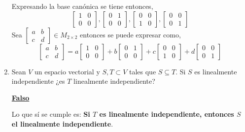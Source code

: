 \documentclass[11pt,letterpaper]{article}
\newcommand{\fals}{\textbf{\underline{Falso} }}
\begin{document}
\begin{enumerate}
Expresando la base canónica se tiene entonces,
\[
\begin{bmatrix}
    1  &  0      \\
    0  &  0      
\end{bmatrix}
, 
\begin{bmatrix}
    0  &  1      \\
    0  &  0      
\end{bmatrix}
, 
\begin{bmatrix}
    0  &  0      \\
    1  &  0      
\end{bmatrix}
, 
\begin{bmatrix}
    0  &  0      \\
    0  &  1      
\end{bmatrix} 
\]
Sea $
    \begin{bmatrix}
    a  &  b      \\
    c  &  d      
    \end{bmatrix} \in M_{2 \times 2}$ entonces se puede expresar como,
    \[
        \begin{bmatrix}
            a  &  b      \\
            c  &  d      
        \end{bmatrix}
        =
        a\begin{bmatrix}
            1  &  0      \\
            0  &  0      
        \end{bmatrix}
        +
        b\begin{bmatrix}
            0  &  1      \\
            0  &  0      
        \end{bmatrix}
        + 
        c\begin{bmatrix}
            0  &  0      \\
            1  &  0      
        \end{bmatrix}
        + 
        d\begin{bmatrix}
            0  &  0      \\
            0  &  1      
        \end{bmatrix} 
        \]


\item Sean $V$ un espacio vectorial y $S,T \subset V$ tales que $S \subseteq T$. Si $S$ es
linealmente independiente ¿es $T$ linealmente independiente?

\fals

Lo que sí se cumple es: \textbf{Si $T$ es linealmente independiente, entonces $S$ el
linealmente independiente}.


\end{enumerate}
\end{document}
